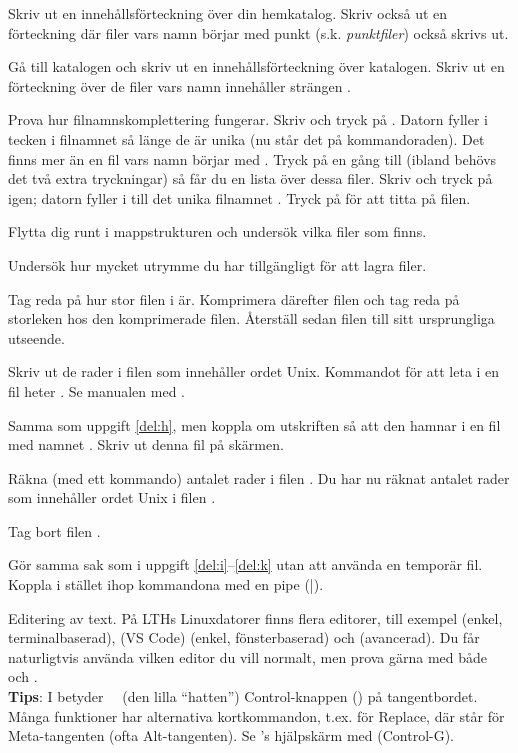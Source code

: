 \begin{Datorarbete}
\begin{Deluppgifter}
\item Skriv ut en innehållsförteckning över din hemkatalog. Skriv också ut en förteckning där filer vars namn börjar med punkt (s.k. \emph{punktfiler}) också skrivs ut.
\item Gå till katalogen  och skriv ut en innehållsförteckning över katalogen. Skriv ut en förteckning över de filer vars namn innehåller strängen .
\item Prova hur filnamnskomplettering fungerar. Skriv  och tryck på . Datorn fyller i tecken i filnamnet så länge de är unika (nu står det  på kommando\-raden). Det finns mer än en fil vars namn börjar med . Tryck på  en gång till (ibland behövs det två extra tryckningar) så får du en lista över dessa filer. Skriv  och tryck på  igen; datorn fyller i till det unika filnamnet . Tryck på  för att titta på filen.
\item Flytta dig runt i mappstrukturen och undersök vilka filer som finns.
\item Undersök hur mycket utrymme du har tillgängligt för att lagra filer.
\item Tag reda på hur stor filen  i  är. Komprimera därefter filen och tag reda på storleken hos den komprimerade filen. Återställ sedan filen till sitt ursprungliga utseende.
\item \label{del:h} Skriv ut de rader i filen  som innehåller ordet Unix. Kommandot för att leta i en fil heter . Se manualen med .
\item \label{del:i} Samma som uppgift \ref{del:h}, men koppla om utskriften så att den hamnar i en fil med namnet . Skriv ut denna fil på skärmen.
\item Räkna (med ett kommando) antalet rader i filen . Du har nu räknat antalet rader som innehåller ordet Unix i filen .
\item \label{del:k} Tag bort filen .
\item Gör samma sak som i uppgift \ref{del:i}--\ref{del:k} utan att använda en temporär fil. Koppla i stället ihop kommandona med en pipe (|).
\end{Deluppgifter}
\item Editering av text. På LTHs Linuxdatorer finns flera editorer, till exempel  (enkel, terminalbaserad),  (VS Code) (enkel, fönsterbaserad) och  (avancerad). Du får naturligtvis använda vilken editor du vill normalt, men prova gärna med både  och .\\
\textbf{Tips}: I  betyder~~\code{^} (den lilla \enquote{hatten}) Control-knappen () på tangentbordet. Många funktioner har alternativa kortkommandon, t.ex.  för Replace, där  står för Meta-tangenten (ofta Alt-tangenten). Se 's hjälpskärm med  (Control-G).


\end{Datorarbete}

